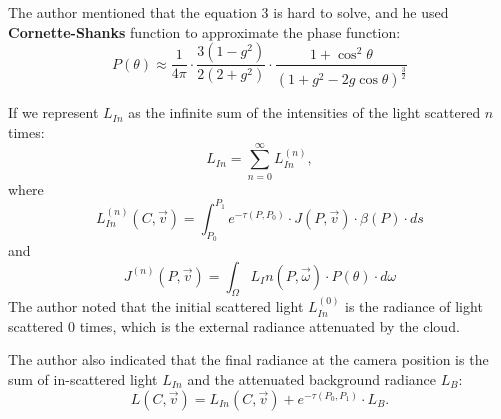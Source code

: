 The author mentioned that the equation 3 is hard to solve, and he used \textbf{Cornette-Shanks} function to approximate the phase function:
\begin{equation}
P(\theta) \approx \frac{1}{4\pi} \cdot \frac{3(1-g^2)}{2(2+g^2)} \cdot \frac{1+\cos^2 {\theta}}{(1+g^2-2g\cos{\theta})^{\frac{3}{2}}}
\end{equation}

If we represent $L_{In}$ as the infinite sum of the intensities of the light scattered $n$ times:
\begin{equation}
L_{In} = \sum_{n=0}^{\infty}L_{In}^{(n)},
\end{equation}
where
\begin{equation}
L_{In}^{(n)}(C, \vec{v}) = \int_{P_0}^{P_1}e^{-\tau(P, P_0)} \cdot J(P, \vec{v}) \cdot \beta(P) \cdot ds
\end{equation}
and
\begin{equation}
J^{(n)}(P, \vec{v}) = \int_{\Omega}L_In(P, \vec{\omega}) \cdot P(\theta) \cdot d\omega
\end{equation}
The author noted that the initial scattered light $L_{In}^{(0)}$ is the radiance of light scattered 0 times, which is the external radiance attenuated by the cloud.

The author also indicated that the final radiance at the camera position is the sum of in-scattered light $L_{In}$ and the attenuated background radiance $L_B$:
\begin{equation}
L(C, \vec{v}) = L_{In}(C, \vec{v}) + e^{-\tau(P_0, P_1)} \cdot L_B.
\end{equation}